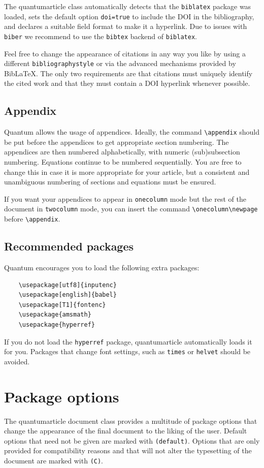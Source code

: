 \documentclass[a4paper,noarxiv,onecolumn]{quantumarticle}
\begin{document}
	The quantumarticle class automatically detects that the \texttt{biblatex} package was loaded, sets the default option \texttt{doi=true} to include the DOI in the bibliography, and declares a suitable field format to make it a hyperlink.
	Due to issues with \texttt{biber} we recommend to use the \texttt{bibtex} backend of \texttt{biblatex}.

	Feel free to change the appearance of citations in any way you like by using a different \texttt{bibliographystyle} or via the advanced mechanisms provided by BibLaTeX.
	The only two requirements are that citations must uniquely identify the cited work and that they must contain a DOI hyperlink whenever possible.

	\subsection{Appendix}
	Quantum allows the usage of appendices. Ideally, the command \texttt{\textbackslash{}appendix} should be put before the appendices to get appropriate section numbering. The appendices are then numbered alphabetically, with numeric (sub)subsection numbering.
	Equations continue to be numbered sequentially.
	You are free to change this in case it is more appropriate for your article, but a consistent and unambiguous numbering of sections and equations must be ensured.

	If you want your appendices to appear in \texttt{onecolumn} mode but the rest of the document in \texttt{twocolumn} mode, you can insert the command \texttt{\textbackslash{}onecolumn\textbackslash{}newpage} before \texttt{\textbackslash{}appendix}.

	\subsection{Recommended packages}
	Quantum encourages you to load the following extra packages:
	\begin{verbatim}
	\usepackage[utf8]{inputenc}
	\usepackage[english]{babel}
	\usepackage[T1]{fontenc}
	\usepackage{amsmath}
	\usepackage{hyperref}
	\end{verbatim}
	If you do not load the \texttt{hyperref} package, quantumarticle automatically loads it for you.
	Packages that change font settings, such as \texttt{times} or \texttt{helvet} should be avoided.

	\section{Package options}
        \label{sec:options}
	The quantumarticle document class provides a multitude of package options that change the appearance of the final document to the liking of the user. Default options that need not be given are marked with \texttt{(default)}. Options that are only provided for compatibility reasons and that will not alter the typesetting of the document are marked with \texttt{(C)}.
\end{document}
